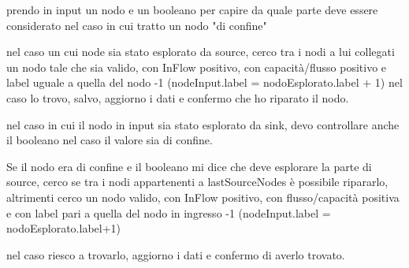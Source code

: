 \documentclass{article}
\begin{document}
prendo in input un nodo e un booleano per capire da quale parte deve essere considerato nel caso in cui tratto un nodo "di confine"

nel caso un cui node sia stato esplorato da source, cerco tra i nodi a lui collegati un nodo tale che sia valido, con InFlow positivo, con capacità/flusso positivo e label uguale a quella del nodo -1 (nodeInput.label = nodoEsplorato.label + 1)
nel caso lo trovo, salvo, aggiorno i dati e confermo che ho riparato il nodo.

nel caso in cui il nodo in input sia stato esplorato da sink, devo controllare anche il booleano nel caso il valore sia di confine.

Se il nodo era di confine e il booleano mi dice che deve esplorare la parte di source, cerco se tra i nodi appartenenti a lastSourceNodes è possibile ripararlo,
altrimenti cerco un nodo valido, con InFlow positivo, con flusso/capacità positiva e con label pari a quella del nodo in ingresso -1 (nodeInput.label = nodoEsplorato.label+1)

nel caso riesco a trovarlo, aggiorno i dati e confermo di averlo trovato.
\end{document}

